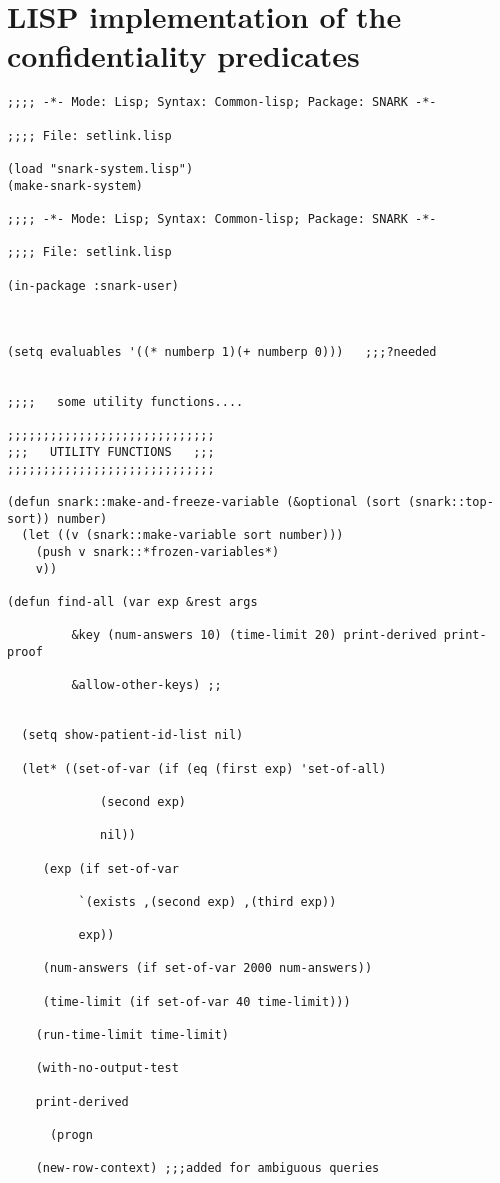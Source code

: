 \section{LISP implementation of the confidentiality predicates}
\label{appendix:snark-code}
\begin{lstlisting}
;;;; -*- Mode: Lisp; Syntax: Common-lisp; Package: SNARK -*-

;;;; File: setlink.lisp

(load "snark-system.lisp")
(make-snark-system)

;;;; -*- Mode: Lisp; Syntax: Common-lisp; Package: SNARK -*-

;;;; File: setlink.lisp

(in-package :snark-user)



(setq evaluables '((* numberp 1)(+ numberp 0)))   ;;;?needed


;;;;   some utility functions....

;;;;;;;;;;;;;;;;;;;;;;;;;;;;;
;;;   UTILITY FUNCTIONS   ;;;
;;;;;;;;;;;;;;;;;;;;;;;;;;;;;

(defun snark::make-and-freeze-variable (&optional (sort (snark::top-sort)) number)
  (let ((v (snark::make-variable sort number)))
    (push v snark::*frozen-variables*)
    v))

(defun find-all (var exp &rest args 

		 &key (num-answers 10) (time-limit 20) print-derived print-proof

		 &allow-other-keys) ;; 


  (setq show-patient-id-list nil)

  (let* ((set-of-var (if (eq (first exp) 'set-of-all)

			 (second exp)

			 nil))

	 (exp (if set-of-var

		  `(exists ,(second exp) ,(third exp))

		  exp))

	 (num-answers (if set-of-var 2000 num-answers))

	 (time-limit (if set-of-var 40 time-limit)))

    (run-time-limit time-limit)

    (with-no-output-test

	print-derived

      (progn

	(new-row-context) ;;;added for ambiguous queries


\end{lstlisting}
